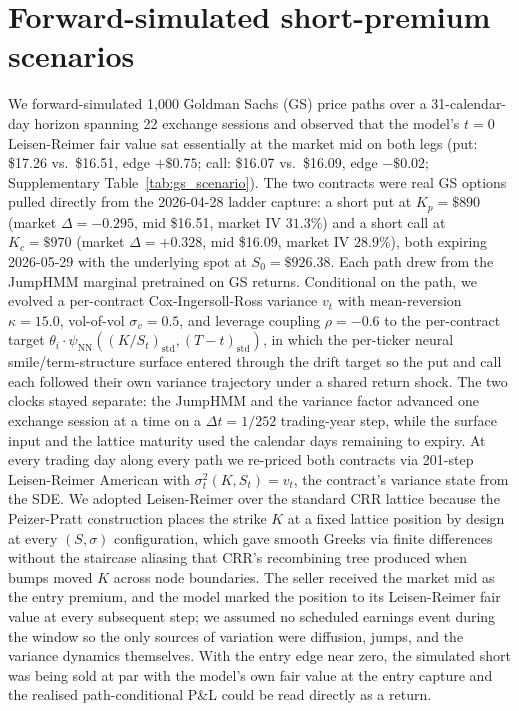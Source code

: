\section{Forward-simulated short-premium scenarios}\label{sec:scenarios}

We forward-simulated 1{,}000 Goldman Sachs (GS) price paths over a 31-calendar-day horizon spanning 22 exchange sessions and observed that the model's $t=0$ Leisen-Reimer fair value sat essentially at the market mid on both legs (put: \$17.26 vs.\ \$16.51, edge $+\$0.75$; call: \$16.07 vs.\ \$16.09, edge $-\$0.02$; Supplementary Table~\ref{tab:gs_scenario}). The two contracts were real GS options pulled directly from the 2026-04-28 ladder capture: a short put at $K_p = \$890$ (market $\Delta = -0.295$, mid \$16.51, market IV $31.3\%$) and a short call at $K_c = \$970$ (market $\Delta = +0.328$, mid \$16.09, market IV $28.9\%$), both expiring 2026-05-29 with the underlying spot at $S_0 = \$926.38$. Each path drew from the JumpHMM marginal pretrained on GS returns. Conditional on the path, we evolved a per-contract Cox-Ingersoll-Ross variance $v_t$ with mean-reversion $\kappa = 15.0$, vol-of-vol $\sigma_v = 0.5$, and leverage coupling $\rho = -0.6$ to the per-contract target $\theta_i \cdot \psi_{\mathrm{NN}}((K/S_t)_{\mathrm{std}}, (T-t)_{\mathrm{std}})$, in which the per-ticker neural smile/term-structure surface entered through the drift target so the put and call each followed their own variance trajectory under a shared return shock. The two clocks stayed separate: the JumpHMM and the variance factor advanced one exchange session at a time on a $\Delta t = 1/252$ trading-year step, while the surface input and the lattice maturity used the calendar days remaining to expiry. At every trading day along every path we re-priced both contracts via 201-step Leisen-Reimer American with $\sigma_t^2(K, S_t) = v_t$, the contract's variance state from the SDE. We adopted Leisen-Reimer over the standard CRR lattice because the Peizer-Pratt construction places the strike $K$ at a fixed lattice position by design at every $(S, \sigma)$ configuration, which gave smooth Greeks via finite differences without the staircase aliasing that CRR's recombining tree produced when bumps moved $K$ across node boundaries. The seller received the market mid as the entry premium, and the model marked the position to its Leisen-Reimer fair value at every subsequent step; we assumed no scheduled earnings event during the window so the only sources of variation were diffusion, jumps, and the variance dynamics themselves. With the entry edge near zero, the simulated short was being sold at par with the model's own fair value at the entry capture and the realised path-conditional P\&L could be read directly as a return.

